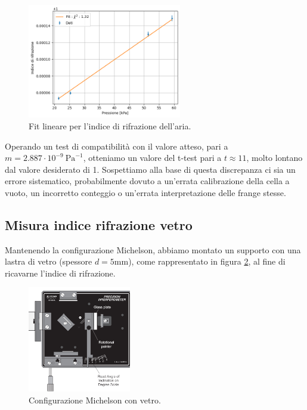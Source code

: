 \documentclass[letterpaper,12pt]{article}
\begin{document}
\begin{figure}[h!]
    \centering
    \includegraphics[width=0.6\textwidth]{fit_m_aria.png}
    \caption{Fit lineare per l'indice di rifrazione dell'aria.}
    \label{fig:m_aria}
\end{figure}

Operando un test di compatibilità con il valore atteso, pari a $m = 2.887 \cdot 10^{-9}\ \text{Pa}^{-1}$, otteniamo un valore del
t-test pari a $t \approx 11$, molto lontano dal valore desiderato di 1.
Sospettiamo alla base di questa discrepanza ci sia un errore sistematico, probabilmente dovuto a un'errata calibrazione
della cella a vuoto, un incorretto conteggio o un'errata interpretazione delle frange stesse.\\


\subsection{Misura indice rifrazione vetro}
Mantenendo la configurazione Michelson, abbiamo montato un supporto con una lastra di vetro (spessore $d= 5\text{mm}$), come rappresentato in figura \ref{fig:michelson_vetro},
al fine di ricavarne l'indice di rifrazione.
\begin{figure}[h!]
    \centering
    \includegraphics[width=0.4\textwidth]{Michelson_vetro.png}
    \caption{Configurazione Michelson con vetro.}
    \label{fig:michelson_vetro}
\end{figure}
\end{document}
